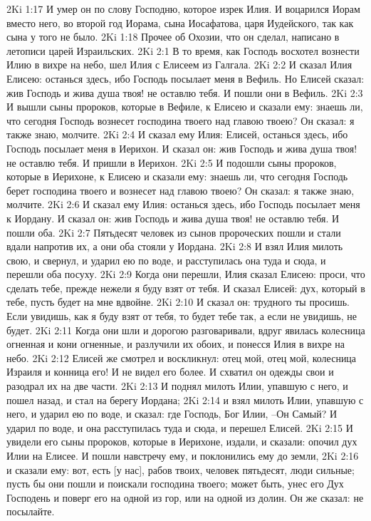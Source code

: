 2Ki 1:17  И умер он по слову Господню, которое изрек Илия. И воцарился Иорам вместо него, во второй год Иорама, сына Иосафатова, царя Иудейского, так как сына у того не было.
2Ki 1:18  Прочее об Охозии, что он сделал, написано в летописи царей Израильских.
2Ki 2:1  В то время, как Господь восхотел вознести Илию в вихре на небо, шел Илия с Елисеем из Галгала.
2Ki 2:2  И сказал Илия Елисею: останься здесь, ибо Господь посылает меня в Вефиль. Но Елисей сказал: жив Господь и жива душа твоя! не оставлю тебя. И пошли они в Вефиль.
2Ki 2:3  И вышли сыны пророков, которые в Вефиле, к Елисею и сказали ему: знаешь ли, что сегодня Господь вознесет господина твоего над главою твоею? Он сказал: я также знаю, молчите.
2Ki 2:4  И сказал ему Илия: Елисей, останься здесь, ибо Господь посылает меня в Иерихон. И сказал он: жив Господь и жива душа твоя! не оставлю тебя. И пришли в Иерихон.
2Ki 2:5  И подошли сыны пророков, которые в Иерихоне, к Елисею и сказали ему: знаешь ли, что сегодня Господь берет господина твоего и вознесет над главою твоею? Он сказал: я также знаю, молчите.
2Ki 2:6  И сказал ему Илия: останься здесь, ибо Господь посылает меня к Иордану. И сказал он: жив Господь и жива душа твоя! не оставлю тебя. И пошли оба.
2Ki 2:7  Пятьдесят человек из сынов пророческих пошли и стали вдали напротив их, а они оба стояли у Иордана.
2Ki 2:8  И взял Илия милоть свою, и свернул, и ударил ею по воде, и расступилась она туда и сюда, и перешли оба посуху.
2Ki 2:9  Когда они перешли, Илия сказал Елисею: проси, что сделать тебе, прежде нежели я буду взят от тебя. И сказал Елисей: дух, который в тебе, пусть будет на мне вдвойне.
2Ki 2:10  И сказал он: трудного ты просишь. Если увидишь, как я буду взят от тебя, то будет тебе так, а если не увидишь, не будет.
2Ki 2:11  Когда они шли и дорогою разговаривали, вдруг явилась колесница огненная и кони огненные, и разлучили их обоих, и понесся Илия в вихре на небо.
2Ki 2:12  Елисей же смотрел и воскликнул: отец мой, отец мой, колесница Израиля и конница его! И не видел его более. И схватил он одежды свои и разодрал их на две части.
2Ki 2:13  И поднял милоть Илии, упавшую с него, и пошел назад, и стал на берегу Иордана;
2Ki 2:14  и взял милоть Илии, упавшую с него, и ударил ею по воде, и сказал: где Господь, Бог Илии, --Он Самый? И ударил по воде, и она расступилась туда и сюда, и перешел Елисей.
2Ki 2:15  И увидели его сыны пророков, которые в Иерихоне, издали, и сказали: опочил дух Илии на Елисее. И пошли навстречу ему, и поклонились ему до земли,
2Ki 2:16  и сказали ему: вот, есть [у нас], рабов твоих, человек пятьдесят, люди сильные; пусть бы они пошли и поискали господина твоего; может быть, унес его Дух Господень и поверг его на одной из гор, или на одной из долин. Он же сказал: не посылайте.
